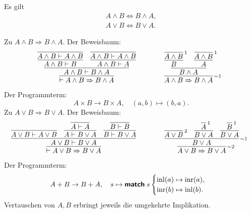\begin{Satz}[Kommutativgesetze]%
\label{bool-cl}
Es gilt
\begin{gather*}
A\land B \iff B\land A,\\
A\lor B \iff B\lor A.
\end{gather*}
\end{Satz}
\begin{Beweis}[Beweis]
Zu $A\land B\Rightarrow B\land A$. Der Beweisbaum:
\[
\begin{array}{@{}l@{\qquad\qquad}l}
\infer{\vdash A\land B\Rightarrow B\land A}{
  \infer{A\land B\vdash B\land A}{
    \infer{A\land B\vdash B}{
      \infer{A\land B\vdash A\land B}{}}
    & \infer{A\land B\vdash A}{
      \infer{A\land B\vdash A\land B}{}}}}
&
\infer[\infernote{$\sim$1}]{A\land B\Rightarrow B\land A}{
  \infer{B\land A}{
     \infer{B}{\infer[\infernote{1}]{A\land B}{}}
     & \infer{A}{\infer[\infernote{1}]{A\land B}{}}}}
\end{array}
\]
Der Programmterm:
\[A\times B\to B\times A,\quad (a,b)\mapsto (b,a).\]
Zu $A\lor B\Rightarrow B\lor A$. Der Beweisbaum:
\[
\begin{array}{@{}l@{\qquad\qquad}l}
\infer{\vdash A\lor B\Rightarrow B\lor A}{
  \infer{A\lor B\vdash B\lor A}{
    \infer{A\lor B\vdash A\lor B}{}
    & \infer{A\vdash B\lor A}{
        \infer{A\vdash A}{}}
    & \infer{B\vdash B\lor A}{
        \infer{B\vdash B}{}}}}
&
\infer[\infernote{$\sim$2}]{A\lor B\Rightarrow B\lor A}{
  \infer[\infernote{$\sim$1}]{B\lor A}{
    \infer[\infernote{2}]{A\lor B}{}
    & \infer{B\lor A}{\infer[\infernote{1}]{A}{}}
    & \infer{B\lor A}{\infer[\infernote{1}]{B}{}}}}
\end{array}
\]
Der Programmterm:
\[A+B\to B+A,\quad s\mapsto\text{{\normalfont\sffamily\bfseries match}}\; s\begin{cases}
\operatorname{inl}(a)\mapsto \operatorname{inr}(a),\\
\operatorname{inr}(b)\mapsto \operatorname{inl}(b).
\end{cases}\]
Vertauschen von $A,B$ erbringt jeweils die umgekehrte Implikation.\;\qedsymbol
\end{Beweis}

